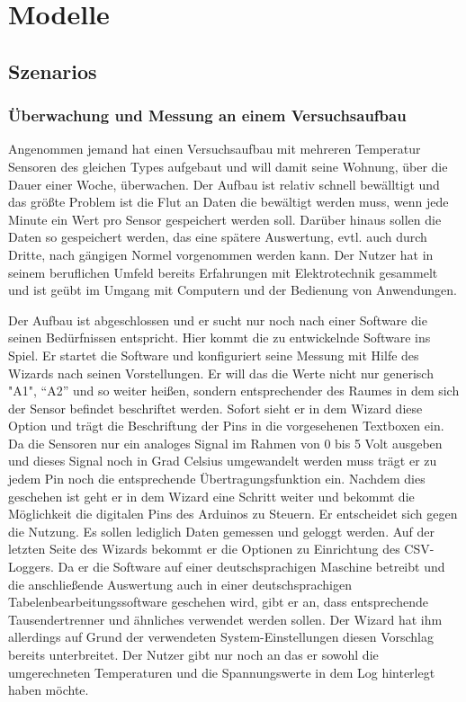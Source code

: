 \chapter{Modelle}
\section{Szenarios}
\subsection{Überwachung und Messung an einem Versuchsaufbau}
Angenommen jemand hat einen Versuchsaufbau mit mehreren Temperatur Sensoren des gleichen Types aufgebaut und will damit seine Wohnung, über die Dauer einer Woche, überwachen. Der Aufbau ist relativ schnell bewälltigt und das größte Problem ist die Flut an Daten die bewältigt werden muss, wenn jede Minute ein Wert pro Sensor gespeichert werden soll. Darüber hinaus sollen die Daten so gespeichert werden, das eine spätere Auswertung, evtl. auch durch Dritte, nach gängigen Normel vorgenommen werden kann. Der Nutzer hat in seinem beruflichen Umfeld bereits Erfahrungen mit Elektrotechnik gesammelt und ist geübt im Umgang mit Computern und der Bedienung von Anwendungen.

Der Aufbau ist abgeschlossen und er sucht nur noch nach einer Software die seinen Bedürfnissen entspricht. Hier kommt die zu entwickelnde Software ins Spiel. Er startet die Software und konfiguriert  seine Messung mit Hilfe des Wizards nach seinen Vorstellungen. Er will das die Werte nicht nur generisch "A1", "`A2"' und so weiter heißen, sondern entsprechender des Raumes in dem sich der Sensor befindet beschriftet werden. Sofort sieht er in dem Wizard diese Option und trägt die Beschriftung der Pins in die vorgesehenen Textboxen ein. Da die Sensoren nur ein analoges Signal im Rahmen von 0 bis 5 Volt ausgeben und dieses Signal noch in Grad Celsius umgewandelt werden muss trägt er zu jedem Pin noch die entsprechende Übertragungsfunktion ein. Nachdem dies geschehen ist geht er in dem Wizard eine Schritt weiter und bekommt die Möglichkeit die digitalen Pins des Arduinos zu Steuern. Er entscheidet sich gegen die Nutzung. Es sollen lediglich Daten gemessen und geloggt werden. Auf der letzten Seite des Wizards bekommt er die Optionen zu Einrichtung des \acrshort{CSV}-Loggers. Da er die Software auf einer deutschsprachigen Maschine betreibt und die anschließende Auswertung auch in einer deutschsprachigen Tabelenbearbeitungssoftware geschehen wird, gibt er an, dass entsprechende Tausendertrenner und ähnliches verwendet werden sollen. Der Wizard hat ihm allerdings auf Grund der verwendeten System-Einstellungen diesen Vorschlag bereits unterbreitet. Der Nutzer gibt nur noch an das er sowohl die umgerechneten Temperaturen und die Spannungswerte in dem Log hinterlegt haben möchte. 

